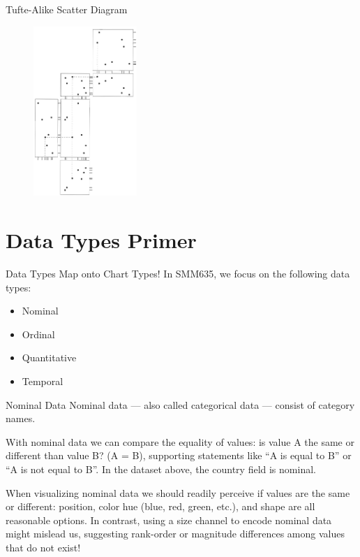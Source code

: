 \documentclass[notes, aspectratio=1610]{beamer}
\begin{document}
\begin{frame}{Tufte-Alike Scatter Diagram}{}
\begin{figure}
		\begin{center}
			\includegraphics[width=0.35\textwidth]{images/rug_plot.png}
		\end{center}
	\end{figure}

\end{frame}

\section{Data Types Primer}

\begin{frame}{Data Types Map onto Chart Types!}{}
In SMM635, we focus on the following data types:
\begin{itemize}
	\item Nominal
	\item Ordinal 
	\item Quantitative
	\item Temporal
\end{itemize}
\end{frame}

\begin{frame}{Nominal Data}
	\small
	Nominal data — also called categorical data — consist of category names.

	\vspace{1em}

	With nominal data we can compare the equality of values: is value A the same or different than value B? (A = B), supporting statements like “A is equal to B” or “A is not equal to B”. In the dataset above, the country field is nominal.
	
	\vspace{1em}

	When visualizing nominal data we should readily perceive if values are
	the same or different: position, color hue (blue, red, green, etc.), and
	shape are all reasonable options. In contrast, using a size channel to
	encode nominal data might mislead us, suggesting rank-order or magnitude
	differences among values that do not exist!
\end{frame}
\end{document}

